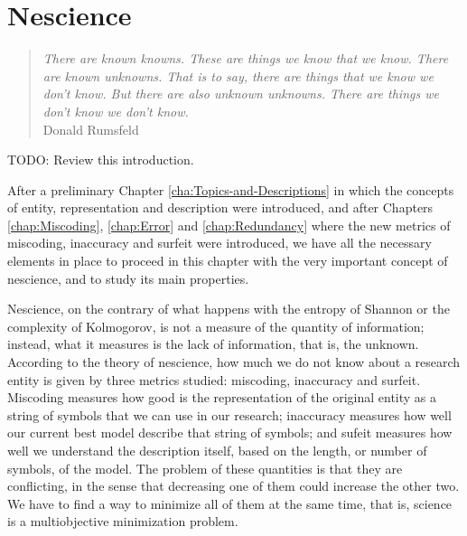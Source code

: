 %
%


%
%


\chapter{Nescience}
\label{chap:Nescience}

\begin{quote}
\begin{flushright}
\emph{There are known knowns. These are things we know that we know.
There are known unknowns. That is to say, there are things that we know we don't know.
But there are also unknown unknowns. There are things we don't know we don't know.} \\
Donald Rumsfeld
\end{flushright}
\end{quote}
\bigskip

{\color{red} TODO: Review this introduction.}

After a preliminary Chapter \ref{cha:Topics-and-Descriptions} in which the concepts of entity, representation and description were introduced, and after Chapters \ref{chap:Miscoding}, \ref{chap:Error} and \ref{chap:Redundancy} where the new metrics of miscoding, inaccuracy and surfeit were introduced, we have all the necessary elements in place to proceed in this chapter with the very important concept of nescience, and to study its main properties.

Nescience, on the contrary of what happens with the entropy of Shannon or the complexity of Kolmogorov, is not a measure of the quantity of information; instead, what it measures is the lack of information, that is, the unknown. According to the theory of nescience, how much we do not know about a research entity is given by three metrics studied: miscoding, inaccuracy and surfeit. Miscoding measures how good is the representation of the original entity as a string of symbols that we can use in our research; inaccuracy measures how well our current best model describe that string of symbols; and sufeit measures how well we understand the description itself, based on the length, or number of symbols, of the model. The problem of these quantities is that they are conflicting, in the sense that decreasing one of them could increase the other two. We have to find a way to minimize all of them at the same time, that is, science is a multiobjective minimization problem.

